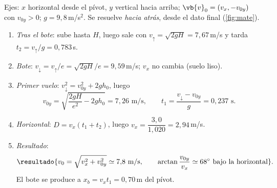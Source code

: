 \begin{resolucion}
Ejes: $x$ horizontal desde el pívot, $y$ vertical hacia arriba; $\vb{v}_{0}=(v_{x},-v_{0y})$ con $v_{0y}>0$; $g=9{,}8$\,m/s$^{2}$.
Se resuelve \emph{hacia atrás}, desde el dato final (\cref{fig:mate}).
\begin{enumerate}
  \item \emph{Tras el bote}: sube hasta $H$, luego sale con $v_{\uparrow}=\sqrt{2gH}=7{,}67$\,m/s y tarda
        $t_{2}=v_{\uparrow}/g=0{,}783$\,s.
  \item \emph{Bote}: $v_{\downarrow}=v_{\uparrow}/e=\sqrt{2gH}/e=9{,}59$\,m/s; $v_{x}$ no cambia (suelo liso).
  \item \emph{Primer vuelo}: $v_{\downarrow}^{2}=v_{0y}^{2}+2gh_{0}$, luego
        \[
          v_{0y}=\sqrt{\frac{2gH}{e^{2}}-2gh_{0}}=7{,}26\text{ m/s},\qquad
          t_{1}=\frac{v_{\downarrow}-v_{0y}}{g}=0{,}237\text{ s}.
        \]
  \item \emph{Horizontal}: $D=v_{x}(t_{1}+t_{2})$, luego $v_{x}=\dfrac{3{,}0}{1{,}020}=2{,}94$\,m/s.
  \item \emph{Resultado}:
        \[
          \resultado{v_{0}=\sqrt{v_{x}^{2}+v_{0y}^{2}}\simeq7{,}8\text{ m/s},\qquad
          \arctan\frac{v_{0y}}{v_{x}}\simeq68^{\circ}\text{ bajo la horizontal}} .
        \]
        El bote se produce a $x_{b}=v_{x}t_{1}=0{,}70$\,m del pívot.\qedhere
\end{enumerate}
\end{resolucion}


